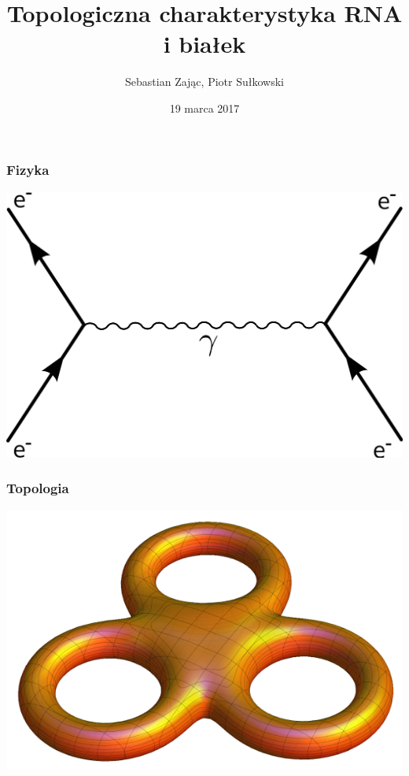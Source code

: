 \documentclass[11pt]{beamer}
\begin{document}
	\author[S.Z, P.S.]{Sebastian Zając, Piotr Sułkowski}
	\title{Topologiczna charakterystyka RNA i białek}
	\date{19 marca 2017}
	\begin{frame}	
			\maketitle
	\end{frame}
		
	\begin{frame}	
	\frametitle{Fizyka}
	\begin{center}
		\includegraphics[scale=0.15]{feydiag}
	\end{center}
		\end{frame}
		\begin{frame}	
		\frametitle{Topologia}
		\begin{center}
			\includegraphics[scale=0.5]{genus}
		\end{center}
	\end{frame}
\end{document}

